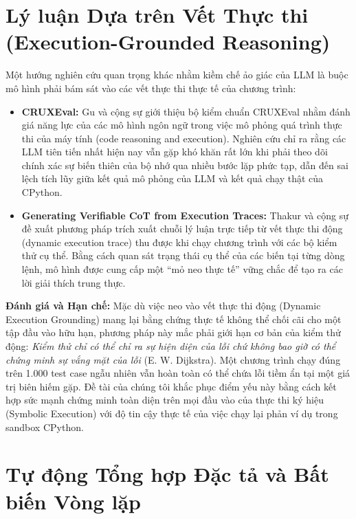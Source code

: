 \section{Lý luận Dựa trên Vết Thực thi (Execution-Grounded Reasoning)}
\label{sec:execution_grounded_reasoning}

Một hướng nghiên cứu quan trọng khác nhằm kiềm chế ảo giác của LLM là buộc mô hình phải bám sát vào các vết thực thi thực tế của chương trình:

\begin{itemize}
    \item \textbf{CRUXEval:} Gu và cộng sự \cite{gu2024cruxeval} giới thiệu bộ kiểm chuẩn CRUXEval nhằm đánh giá năng lực của các mô hình ngôn ngữ trong việc mô phỏng quá trình thực thi của máy tính (code reasoning and execution). Nghiên cứu chỉ ra rằng các LLM tiên tiến nhất hiện nay vẫn gặp khó khăn rất lớn khi phải theo dõi chính xác sự biến thiên của bộ nhớ qua nhiều bước lặp phức tạp, dẫn đến sai lệch tích lũy giữa kết quả mô phỏng của LLM và kết quả chạy thật của CPython.
    \item \textbf{Generating Verifiable CoT from Execution Traces:} Thakur và cộng sự \cite{thakur2026think} đề xuất phương pháp trích xuất chuỗi lý luận trực tiếp từ vết thực thi động (dynamic execution trace) thu được khi chạy chương trình với các bộ kiểm thử cụ thể. Bằng cách quan sát trạng thái cụ thể của các biến tại từng dòng lệnh, mô hình được cung cấp một ``mỏ neo thực tế'' vững chắc để tạo ra các lời giải thích trung thực.
\end{itemize}

\noindent\textbf{Đánh giá và Hạn chế:} Mặc dù việc neo vào vết thực thi động (Dynamic Execution Grounding) mang lại bằng chứng thực tế không thể chối cãi cho một tập đầu vào hữu hạn, phương pháp này mắc phải giới hạn cơ bản của kiểm thử động: \textit{Kiểm thử chỉ có thể chỉ ra sự hiện diện của lỗi chứ không bao giờ có thể chứng minh sự vắng mặt của lỗi} (E. W. Dijkstra). Một chương trình chạy đúng trên 1.000 test case ngẫu nhiên vẫn hoàn toàn có thể chứa lỗi tiềm ẩn tại một giá trị biên hiếm gặp. Đề tài của chúng tôi khắc phục điểm yếu này bằng cách kết hợp sức mạnh chứng minh toàn diện trên mọi đầu vào của thực thi ký hiệu (Symbolic Execution) với độ tin cậy thực tế của việc chạy lại phản ví dụ trong sandbox CPython.

\section{Tự động Tổng hợp Đặc tả và Bất biến Vòng lặp}
\label{sec:specification_and_invariant_synthesis}

